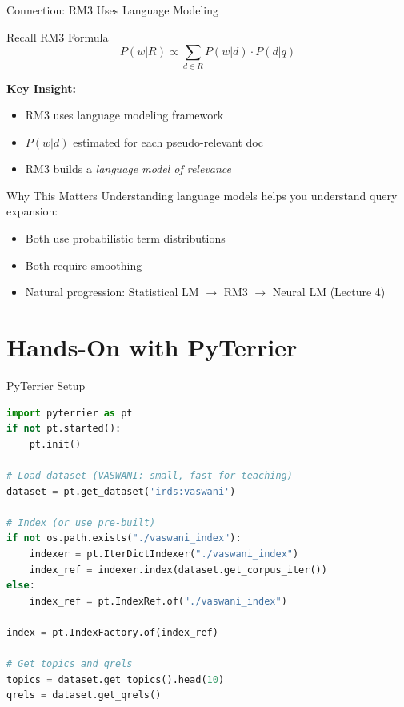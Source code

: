 \documentclass[aspectratio=169]{beamer}
\begin{document}
\begin{frame}{Connection: RM3 Uses Language Modeling}
\begin{block}{Recall RM3 Formula}
$$P(w|R) \propto \sum_{d \in R} P(w|d) \cdot P(d|q)$$
\end{block}

\vspace{0.5em}

\textbf{Key Insight:}
\begin{itemize}
    \item RM3 uses language modeling framework
    \item $P(w|d)$ estimated for each pseudo-relevant doc
    \item RM3 builds a \textit{language model of relevance}
\end{itemize}

\vspace{0.5em}

\begin{exampleblock}{Why This Matters}
Understanding language models helps you understand query expansion:
\begin{itemize}
    \item Both use probabilistic term distributions
    \item Both require smoothing
    \item Natural progression: Statistical LM $\rightarrow$ RM3 $\rightarrow$ Neural LM (Lecture 4)
\end{itemize}
\end{exampleblock}
\end{frame}


\section{Hands-On with PyTerrier}

\begin{frame}[plain]
\sectionpage
\end{frame}

\begin{frame}[fragile]{PyTerrier Setup}
\begin{lstlisting}[language=Python]
import pyterrier as pt
if not pt.started():
    pt.init()

# Load dataset (VASWANI: small, fast for teaching)
dataset = pt.get_dataset('irds:vaswani')

# Index (or use pre-built)
if not os.path.exists("./vaswani_index"):
    indexer = pt.IterDictIndexer("./vaswani_index")
    index_ref = indexer.index(dataset.get_corpus_iter())
else:
    index_ref = pt.IndexRef.of("./vaswani_index")

index = pt.IndexFactory.of(index_ref)

# Get topics and qrels
topics = dataset.get_topics().head(10)
qrels = dataset.get_qrels()
\end{lstlisting}
\end{frame}
\end{document}

